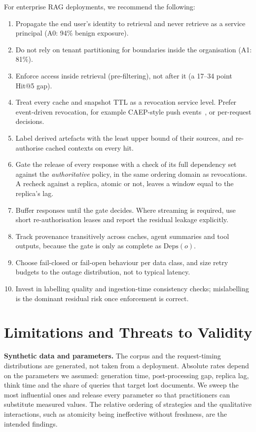\documentclass[10pt]{article}
\begin{document}
For enterprise RAG deployments, we recommend the following:
\begin{enumerate}\itemsep0pt
\item Propagate the end user's identity to retrieval and never retrieve as a service principal (A0: 94\% benign exposure).
\item Do not rely on tenant partitioning for boundaries inside the organisation (A1: 81\%).
\item Enforce access inside retrieval (pre-filtering), not after it (a 17--34 point Hit@5 gap).
\item Treat every cache and snapshot TTL as a revocation service level. Prefer event-driven revocation, for example CAEP-style push events~\cite{caep2025}, or per-request decisions.
\item Label derived artefacts with the least upper bound of their sources, and re-authorise cached contexts on every hit.
\item Gate the release of every response with a check of its full dependency set against the \emph{authoritative} policy, in the same ordering domain as revocations. A recheck against a replica, atomic or not, leaves a window equal to the replica's lag.
\item Buffer responses until the gate decides. Where streaming is required, use short re-authorisation leases and report the residual leakage explicitly.
\item Track provenance transitively across caches, agent summaries and tool outputs, because the gate is only as complete as $\mathrm{Deps}(o)$.
\item Choose fail-closed or fail-open behaviour per data class, and size retry budgets to the outage distribution, not to typical latency.
\item Invest in labelling quality and ingestion-time consistency checks; mislabelling is the dominant residual risk once enforcement is correct.
\end{enumerate}

\section{Limitations and Threats to Validity}
\label{sec:limits}
\textbf{Synthetic data and parameters.} The corpus and the request-timing distributions are generated, not taken from a deployment. Absolute rates depend on the parameters we assumed: generation time, post-processing gap, replica lag, think time and the share of queries that target lost documents. We sweep the most influential ones and release every parameter so that practitioners can substitute measured values. The relative ordering of strategies and the qualitative interactions, such as atomicity being ineffective without freshness, are the intended findings.
\end{document}
